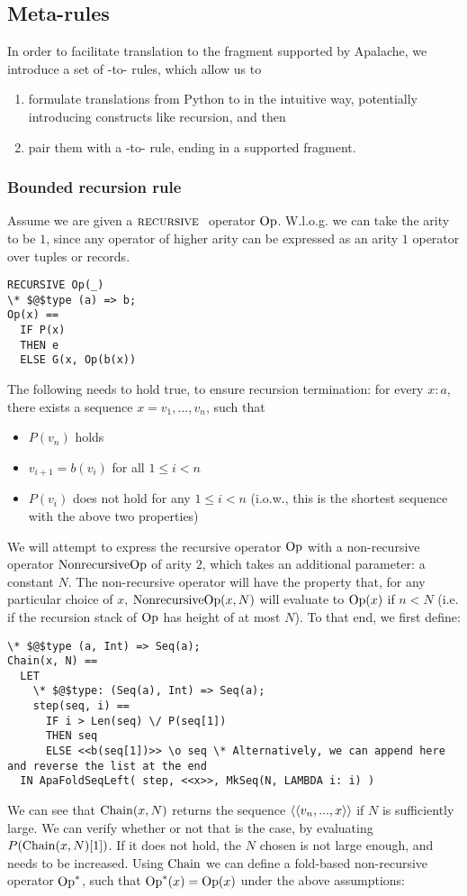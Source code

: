 \subsection{ Meta-rules}

In order to facilitate translation to the \tlap{} fragment supported by Apalache, we introduce a set of \tlap{}-to-\tlap{} rules, which allow us to
\begin{enumerate}
\item formulate translations from Python to \tlap{} in the intuitive way, potentially introducing constructs like recursion, and then
\item pair them with a \tlap{}-to-\tlap{} rule, ending in a supported fragment.
\end{enumerate}

\subsubsection{Bounded recursion rule}

Assume we are given a $\textsc{recursive }$ operator $\mathrm{Op}$. W.l.o.g. we can take the arity to be $1$, since any operator of higher arity can be expressed as an arity $1$ operator over tuples or records.
\begin{lstlisting}[language=tla,columns=fullflexible]
RECURSIVE Op(_)
\* $@$type (a) => b;
Op(x) ==
  IF P(x)
  THEN e
  ELSE G(x, Op(b(x))
\end{lstlisting}
The following needs to hold true, to ensure recursion termination: for every $x\colon a$, there exists a sequence $x = v_1, \dots, v_n$, such that
\begin{itemize}
\item $P(v_n)$ holds
\item $v_{i+1} = b(v_i)$ for all $1 \le i < n$
\item $P(v_i)$ does not hold for any $1 \le i < n$ (i.o.w., this is the shortest sequence with the above two properties)
\end{itemize}
%
We will attempt to express the recursive operator $\mathrm{Op}$ with a non-recursive operator $\mathrm{NonrecursiveOp}$ of arity $2$, which takes an additional parameter: a constant $N$. The non-recursive operator will have the property that, for any particular choice of $x$, $\mathrm{NonrecursiveOp}(x, N)$ will evaluate to $\mathrm{Op}(x)$ if $n < N$ (i.e. if the recursion stack of $\mathrm{Op}$ has height of at most $N$).
%
To that end, we first define:
\begin{lstlisting}[language=tla,columns=fullflexible]
\* $@$type (a, Int) => Seq(a);
Chain(x, N) ==
  LET 
    \* $@$type: (Seq(a), Int) => Seq(a);
    step(seq, i) ==
      IF i > Len(seq) \/ P(seq[1])
      THEN seq
      ELSE <<b(seq[1])>> \o seq \* Alternatively, we can append here and reverse the list at the end
  IN ApaFoldSeqLeft( step, <<x>>, MkSeq(N, LAMBDA i: i) )
\end{lstlisting}
%
We can see that $\mathrm{Chain}(x,N)$ returns the sequence $\left<\left<v_n, ..., x\right>\right>$ if $N$ is sufficiently large. We can verify whether or not that is the case, by evaluating $P(\mathrm{Chain}(x, N)[1])$. If it does not hold, the $N$ chosen is not large enough, and needs to be increased. Using $\mathrm{Chain}$ we can define a fold-based non-recursive operator $\mathrm{Op}^*$, such that $\mathrm{Op}^*(x) = \mathrm{Op}(x)$ under the above assumptions:

